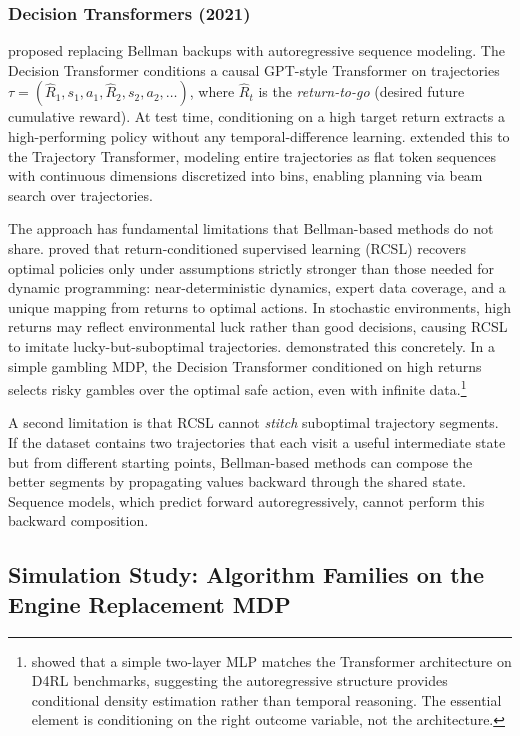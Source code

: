 \subsubsection{Decision Transformers (2021)}
\label{subsubsec:decision_transformers}

\citet{Chen2021DT} proposed replacing Bellman backups with autoregressive
sequence modeling. The Decision Transformer conditions a causal GPT-style
Transformer on trajectories $\tau = (\hat{R}_1, s_1, a_1, \hat{R}_2, s_2,
a_2, \ldots)$, where $\hat{R}_t$ is the \emph{return-to-go} (desired future
cumulative reward). At test time, conditioning on a high target return
extracts a high-performing policy without any temporal-difference learning.
\citet{Janner2021TT} extended this to the Trajectory Transformer, modeling
entire trajectories as flat token sequences with continuous dimensions
discretized into bins, enabling planning via beam search over trajectories.

The approach has fundamental limitations that Bellman-based methods do not
share. \citet{Brandfonbrener2022} proved that return-conditioned supervised
learning (RCSL) recovers optimal policies only under assumptions strictly
stronger than those needed for dynamic programming: near-deterministic
dynamics, expert data coverage, and a unique mapping from returns to optimal
actions. In stochastic environments, high returns may reflect environmental
luck rather than good decisions, causing RCSL to imitate lucky-but-suboptimal
trajectories. \citet{Paster2022} demonstrated this concretely. In a simple
gambling MDP, the Decision Transformer conditioned on high returns selects
risky gambles over the optimal safe action, even with infinite
data.\footnote{\citet{Emmons2022} showed that a simple two-layer MLP matches
the Transformer architecture on D4RL benchmarks, suggesting the
autoregressive structure provides conditional density estimation rather than
temporal reasoning. The essential element is conditioning on the right outcome
variable, not the architecture.}

A second limitation is that RCSL cannot \emph{stitch} suboptimal trajectory
segments. If the dataset contains two trajectories that each visit a useful
intermediate state but from different starting points, Bellman-based methods
can compose the better segments by propagating values backward through the
shared state. Sequence models, which predict forward autoregressively, cannot
perform this backward composition.

\FloatBarrier
\subsection{Simulation Study: Algorithm Families on the Engine Replacement MDP}
\label{sec:engine_algorithms}


